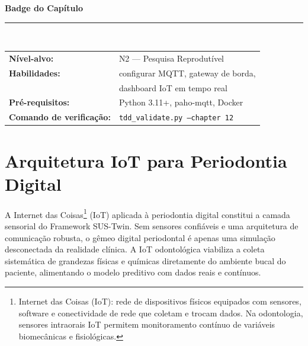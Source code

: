 \label{ch:plataformas}

\begin{highlight}
\large\textbf{Badge do Capítulo}\\[4pt]
\rule{\textwidth}{1pt}\\[4pt]
\begin{tabular}{ll}
\textbf{Nível-alvo:} & N2 --- Pesquisa Reprodutível \\
\textbf{Habilidades:} & configurar MQTT, gateway de borda, \\
                     & dashboard IoT em tempo real \\
\textbf{Pré-requisitos:} & Python 3.11+, paho-mqtt, Docker \\
\textbf{Comando de verificação:} & \texttt{tdd\_validate.py --chapter 12}
\end{tabular}
\end{highlight}


\section{Arquitetura IoT para Periodontia Digital}

A Internet das Coisas\footnote{Internet das Coisas (IoT): rede de dispositivos físicos equipados com sensores, software e conectividade de rede que coletam e trocam dados. Na odontologia, sensores intraorais IoT permitem monitoramento contínuo de variáveis biomecânicas e fisiológicas.} (IoT) aplicada à periodontia digital constitui a camada sensorial do Framework SUS-Twin. Sem sensores confiáveis e uma arquitetura de comunicação robusta, o gêmeo digital periodontal é apenas uma simulação desconectada da realidade clínica. A IoT odontológica viabiliza a coleta sistemática de grandezas físicas e químicas diretamente do ambiente bucal do paciente, alimentando o modelo preditivo com dados reais e contínuos.

